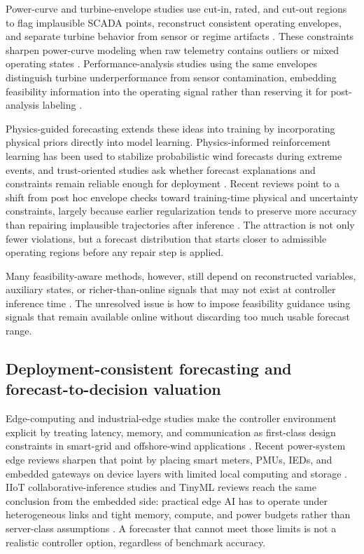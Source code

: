 \documentclass[review,1p,times]{elsarticle}
\begin{document}
Power-curve and turbine-envelope studies use cut-in, rated, and cut-out regions to flag implausible SCADA points, reconstruct consistent operating envelopes, and separate turbine behavior from sensor or regime artifacts \citep{astolfi2015datamining,martincalzada2025optimized,burton2011wind,iec61400_12_1_2017}. These constraints sharpen power-curve modeling when raw telemetry contains outliers or mixed operating states \citep{astolfi2015datamining,martincalzada2025optimized}. Performance-analysis studies using the same envelopes distinguish turbine underperformance from sensor contamination, embedding feasibility information into the operating signal rather than reserving it for post-analysis labeling \citep{astolfi2015datamining,burton2011wind}.

Physics-guided forecasting extends these ideas into training by incorporating physical priors directly into model learning. Physics-informed reinforcement learning has been used to stabilize probabilistic wind forecasts during extreme events, and trust-oriented studies ask whether forecast explanations and constraints remain reliable enough for deployment \citep{liu2024physics,liao2024trust}. Recent reviews point to a shift from post hoc envelope checks toward training-time physical and uncertainty constraints, largely because earlier regularization tends to preserve more accuracy than repairing implausible trajectories after inference \citep{parsa2025physics,wang2025review}. The attraction is not only fewer violations, but a forecast distribution that starts closer to admissible operating regions before any repair step is applied.

Many feasibility-aware methods, however, still depend on reconstructed variables, auxiliary states, or richer-than-online signals that may not exist at controller inference time \citep{liu2024physics,liao2024trust,martincalzada2025optimized}. The unresolved issue is how to impose feasibility guidance using signals that remain available online without discarding too much usable forecast range.

\subsection{Deployment-consistent forecasting and forecast-to-decision valuation}
\label{subsec:related_dispatch}

Edge-computing and industrial-edge studies make the controller environment explicit by treating latency, memory, and communication as first-class design constraints in smart-grid and offshore-wind applications \citep{zhou2019edge,gooi2023edgeintelligence,mwangi2024sdniiotedge}. Recent power-system edge reviews sharpen that point by placing smart meters, PMUs, IEDs, and embedded gateways on device layers with limited local computing and storage \citep{liang2024edgepower}. IIoT collaborative-inference studies and TinyML reviews reach the same conclusion from the embedded side: practical edge AI has to operate under heterogeneous links and tight memory, compute, and power budgets rather than server-class assumptions \citep{chen2025selfawareedge,ortiz2025tinyml}. A forecaster that cannot meet those limits is not a realistic controller option, regardless of benchmark accuracy.
\end{document}
